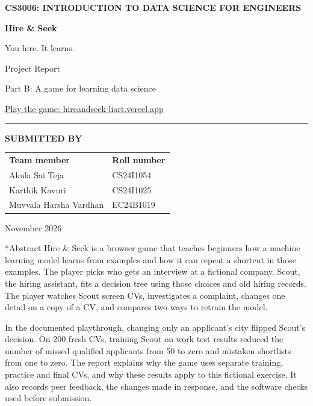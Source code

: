 \documentclass[11pt,a4paper]{article}
\makeatletter
\renewcommand\section{\@startsection{section}{1}{\z@}{-2.2ex \@plus -.5ex}{0.8ex}{\Large\sffamily\bfseries\color{Ink}}}
\newcommand{\eyebrow}[1]{{\small\sffamily\bfseries\color{Teal}#1}\par}
\makeatother
\begin{document}
\hypersetup{pageanchor=false}
\begin{titlepage}
\vspace*{22mm}
\eyebrow{CS3006: INTRODUCTION TO DATA SCIENCE FOR ENGINEERS}
\vspace{8mm}
{\fontsize{46}{51}\selectfont\sffamily\bfseries\color{Ink}Hire \& Seek\par}
{\LARGE\sffamily\color{Teal}You hire. It learns.\par}
\vspace{8mm}
{\Large\sffamily\color{Ink}Project Report\par}
{\large\color{Muted}Part B: A game for learning data science\par}
\vspace{3mm}
{\small\sffamily\href{https://hireandseek-liart.vercel.app/}{Play the game: hireandseek-liart.vercel.app}\par}
\vspace{9mm}
\textcolor{Line}{\rule{\linewidth}{1.2pt}}
\vspace{3mm}

\eyebrow{SUBMITTED BY}
\begin{tabularx}{\linewidth}{@{}Yl@{}}
\textbf{Team member} & \textbf{Roll number}\\
Akula Sai Teja & CS24I1054\\
Karthik Kavuri & CS24I1025\\
Muvvala Harsha Vardhan & EC24B1019\\
\end{tabularx}

\vfill
{\large\color{Muted}November 2026\par}
\end{titlepage}
\hypersetup{pageanchor=true}
\section*{Abstract}
Hire \& Seek is a browser game that teaches beginners how a machine learning model learns from examples and how it can repeat a shortcut in those examples. The player picks who gets an interview at a fictional company. Scout, the hiring assistant, fits a decision tree using those choices and old hiring records. The player watches Scout screen CVs, investigates a complaint, changes one detail on a copy of a CV, and compares two ways to retrain the model.

In the documented playthrough, changing only an applicant's city flipped Scout's decision. On 200 fresh CVs, training Scout on work test results reduced the number of missed qualified applicants from 50 to zero and mistaken shortlists from one to zero. The report explains why the game uses separate training, practice and final CVs, and why these results apply to this fictional exercise. It also records peer feedback, the changes made in response, and the software checks used before submission.
\end{document}
